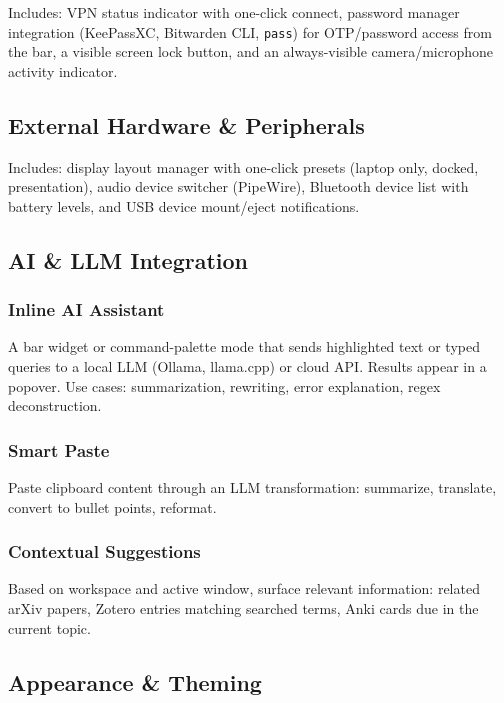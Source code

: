 \documentclass[11pt,a4paper]{article}
\begin{document}
Includes: VPN status indicator with one-click connect, password manager integration (KeePassXC, Bitwarden CLI, \texttt{pass}) for OTP/password access from the bar, a visible screen lock button, and an always-visible camera/microphone activity indicator.


\subsection{External Hardware \& Peripherals}
\label{sec:features-hardware}

Includes: display layout manager with one-click presets (laptop only, docked, presentation), audio device switcher (PipeWire), Bluetooth device list with battery levels, and USB device mount/eject notifications.


\subsection{AI \& LLM Integration}
\label{sec:features-ai}

\subsubsection{Inline AI Assistant}
A bar widget or command-palette mode that sends highlighted text or typed queries to a local LLM (Ollama, llama.cpp) or cloud API. Results appear in a popover. Use cases: summarization, rewriting, error explanation, regex deconstruction.

\subsubsection{Smart Paste}
Paste clipboard content through an LLM transformation: summarize, translate, convert to bullet points, reformat.

\subsubsection{Contextual Suggestions}
Based on workspace and active window, surface relevant information: related arXiv papers, Zotero entries matching searched terms, Anki cards due in the current topic.


\subsection{Appearance \& Theming}
\label{sec:features-theming}
\end{document}
